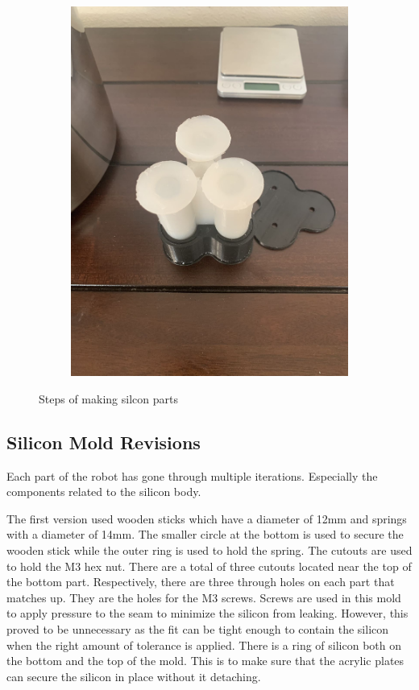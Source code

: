 \documentclass[twoside]{article}
\begin{document}
\begin{figure}[H]
\begin{subfigure}[b]{0.33\linewidth}
		\includegraphics[width=\textwidth]{extract}
	\end{subfigure}%
	\caption{Steps of making silcon parts}
\end{figure}
\subsection{Silicon Mold Revisions}
Each part of the robot has gone through multiple iterations. Especially the components related to the silicon body. 

The first version used wooden sticks which have a diameter of 12mm and springs with a diameter of 14mm. The smaller circle at the bottom is used to secure the wooden stick while the outer ring is used to hold the spring. The cutouts are used to hold the M3 hex nut. There are a total of three cutouts located near the top of the bottom part. Respectively, there are three through holes on each part that matches up. They are the holes for the M3 screws. Screws are used in this mold to apply pressure to the seam to minimize the silicon from leaking. However, this proved to be unnecessary as the fit can be tight enough to contain the silicon when the right amount of tolerance is applied. There is a ring of silicon both on the bottom and the top of the mold. This is to make sure that the acrylic plates can secure the silicon in place without it detaching.
\end{document}

